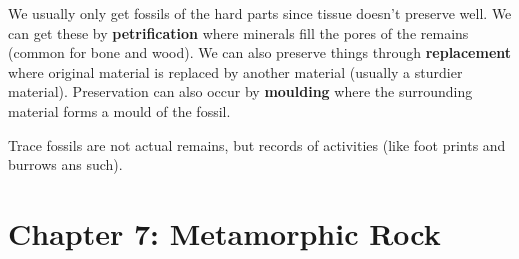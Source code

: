 \documentclass{article}
\begin{document}
We usually only get fossils of the hard parts since tissue doesn't preserve well. We can get these by \textbf{petrification} where minerals fill the pores of the remains (common for bone and wood). We can also preserve things through \textbf{replacement} where original material is replaced by another material (usually a sturdier material). Preservation can also occur by \textbf{moulding} where the surrounding material forms a mould of the fossil.

Trace fossils are not actual remains, but records of activities (like foot prints and burrows ans such).

\section*{Chapter 7: Metamorphic Rock} %
\label{sec:chapter_7_metamorphic_rock}






\end{document}
